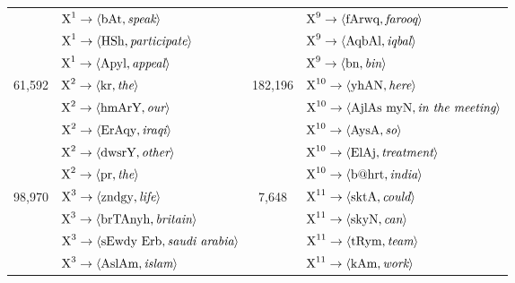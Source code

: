 \begin{table}[h]
\begin{center}
\begin{tabular}{|c|l|c|l|}
 & $ \textrm{X}^{1} \rightarrow \langle \textrm{bAt},\textrm{{\emph speak}} \rangle $ & & $ \textrm{X}^{9} \rightarrow \langle \textrm{fArwq},\textrm{{\emph farooq}} \rangle $ \\
 & $ \textrm{X}^{1} \rightarrow \langle \textrm{HSh},\textrm{{\emph participate}} \rangle $ & & $ \textrm{X}^{9} \rightarrow \langle \textrm{AqbAl},\textrm{{\emph iqbal}} \rangle $ \\
 & $ \textrm{X}^{1} \rightarrow \langle \textrm{Apyl},\textrm{{\emph appeal}} \rangle $ & & $ \textrm{X}^{9} \rightarrow \langle \textrm{bn},\textrm{{\emph bin}} \rangle $ \\
\hline
61,592 & $ \textrm{X}^{2} \rightarrow \langle \textrm{kr},\textrm{{\emph the}} \rangle $ &182,196 & $ \textrm{X}^{10} \rightarrow \langle \textrm{yhAN},\textrm{{\emph here}} \rangle $ \\
 & $ \textrm{X}^{2} \rightarrow \langle \textrm{hmArY},\textrm{{\emph our}} \rangle $ & & $ \textrm{X}^{10} \rightarrow \langle \textrm{AjlAs myN},\textrm{{\emph in the meeting}} \rangle $ \\
 & $ \textrm{X}^{2} \rightarrow \langle \textrm{ErAqy},\textrm{{\emph iraqi}} \rangle $ & & $ \textrm{X}^{10} \rightarrow \langle \textrm{AysA},\textrm{{\emph so}} \rangle $ \\
 & $ \textrm{X}^{2} \rightarrow \langle \textrm{dwsrY},\textrm{{\emph other}} \rangle $ & & $ \textrm{X}^{10} \rightarrow \langle \textrm{ElAj},\textrm{{\emph treatment}} \rangle $ \\
 & $ \textrm{X}^{2} \rightarrow \langle \textrm{pr},\textrm{{\emph the}} \rangle $ & & $ \textrm{X}^{10} \rightarrow \langle \textrm{b@hrt},\textrm{{\emph india}} \rangle $ \\
\hline
98,970 & $ \textrm{X}^{3} \rightarrow \langle \textrm{zndgy},\textrm{{\emph life}} \rangle $ &7,648 & $ \textrm{X}^{11} \rightarrow \langle \textrm{sktA},\textrm{{\emph could}} \rangle $ \\
 & $ \textrm{X}^{3} \rightarrow \langle \textrm{brTAnyh},\textrm{{\emph britain}} \rangle $ & & $ \textrm{X}^{11} \rightarrow \langle \textrm{skyN},\textrm{{\emph can}} \rangle $ \\
 & $ \textrm{X}^{3} \rightarrow \langle \textrm{sEwdy Erb},\textrm{{\emph saudi arabia}} \rangle $ & & $ \textrm{X}^{11} \rightarrow \langle \textrm{tRym},\textrm{{\emph team}} \rangle $ \\
 & $ \textrm{X}^{3} \rightarrow \langle \textrm{AslAm},\textrm{{\emph islam}} \rangle $ & & $ \textrm{X}^{11} \rightarrow \langle \textrm{kAm},\textrm{{\emph work}} \rangle $ \\

\end{tabular}
\end{center}
\end{table}
